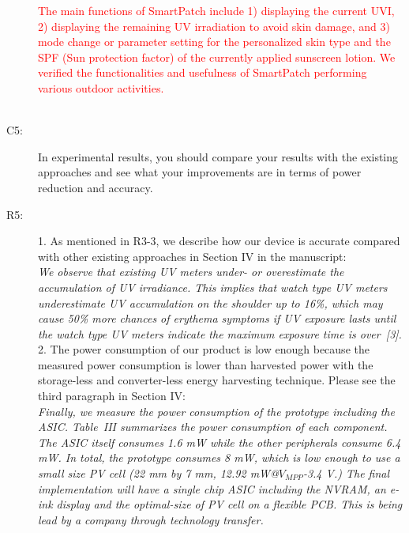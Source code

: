 \documentclass[onecolumn]{IEEEconf}
\begin{document}
\begin{description}
 \textcolor{red}{The main functions of SmartPatch include 1) displaying the current UVI, 2) displaying the remaining UV irradiation to avoid skin damage, and 3) mode change or parameter setting for the personalized skin type and the SPF (Sun protection factor) of the currently applied sunscreen lotion. We verified the functionalities and usefulness of SmartPatch performing various outdoor activities.}\\
~\\

\item [C5: ] In experimental results, you should compare your results with the existing approaches and see what your improvements are in terms of power reduction and accuracy.
\item [R5: ] 
1. As mentioned in R3-3, we describe how our device is accurate compared with other existing approaches in Section IV in the manuscript:\\

\textit{We observe that existing UV meters under- or overestimate the accumulation of UV irradiance.
This implies that watch type UV meters underestimate UV accumulation on the shoulder up to 16\%, which may cause 50\% more chances of erythema symptoms if UV exposure lasts until the watch type UV meters indicate the maximum exposure time is over~[3].}\\

2. The power consumption of our product is low enough because the measured power consumption is lower than harvested power with the storage-less and converter-less energy harvesting technique. Please see the third paragraph in Section IV:\\

\textit{Finally, we measure the power consumption of the prototype including the ASIC. Table~III summarizes the power consumption of each component. The ASIC itself consumes 1.6 mW while the other peripherals consume 6.4 mW. In total, the prototype consumes 8 mW, which is low enough to use a small size PV cell (22 mm by 7 mm, 12.92 mW@$V_{MPP}$-3.4 V.) The final implementation will have a single chip ASIC including the NVRAM, an e-ink display and the optimal-size of PV cell on a flexible PCB. This is being lead by a company through technology transfer.}

\end{description}
\end{document}
